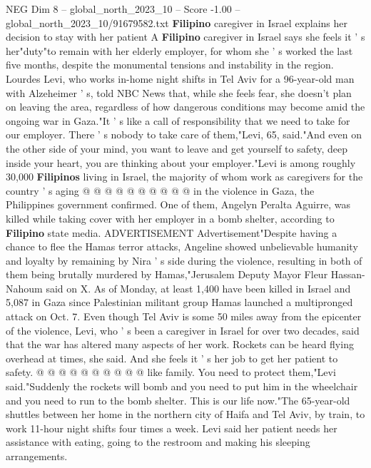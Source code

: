 \begin{textsample}{NEG Dim 8 – global\_north\_2023\_10 – Score -1.00 – global\_north\_2023\_10/91679582.txt}  \label{ex:f8_neg_239}
\textbf{Filipino} caregiver in Israel explains her decision to stay with her patient A \textbf{Filipino} caregiver in Israel says she feels it ' s her"duty"to remain with her elderly employer, for whom she ' s worked the last five months, despite the monumental tensions and instability in the region.
Lourdes Levi, who works in-home night shifts in Tel Aviv for a 96-year-old man with Alzeheimer ' s, told NBC News that, while she feels fear, she doesn't plan on leaving the area, regardless of how dangerous conditions may become amid the ongoing war in Gaza."It ' s like a call of responsibility that we need to take for our employer.
There ' s nobody to take care of them,"Levi, 65, said."And even on the other side of your mind, you want to leave and get yourself to safety, deep inside your heart, you are thinking about your employer."Levi is among roughly 30,000 \textbf{Filipinos} living in Israel, the majority of whom work as caregivers for the country ' s aging @ @ @ @ @ @ @ @ @ @ in the violence in Gaza, the Philippines government confirmed.
One of them, Angelyn Peralta Aguirre, was killed while taking cover with her employer in a bomb shelter, according to \textbf{Filipino} state media.
ADVERTISEMENT Advertisement"Despite having a chance to flee the Hamas terror attacks, Angeline showed unbelievable humanity and loyalty by remaining by Nira ' s side during the violence, resulting in both of them being brutally murdered by Hamas,"Jerusalem Deputy Mayor Fleur Hassan-Nahoum said on X.
As of Monday, at least 1,400 have been killed in Israel and 5,087 in Gaza since Palestinian militant group Hamas launched a multipronged attack on Oct. 7.
Even though Tel Aviv is some 50 miles away from the epicenter of the violence, Levi, who ' s been a caregiver in Israel for over two decades, said that the war has altered many aspects of her work.
Rockets can be heard flying overhead at times, she said.
And she feels it ' s her job to get her patient to safety. @ @ @ @ @ @ @ @ @ @ like family.
You need to protect them,"Levi said."Suddenly the rockets will bomb and you need to put him in the wheelchair and you need to run to the bomb shelter.
This is our life now."The 65-year-old shuttles between her home in the northern city of Haifa and Tel Aviv, by train, to work 11-hour night shifts four times a week.
Levi said her patient needs her assistance with eating, going to the restroom and making his sleeping arrangements.

\end{textsample}
